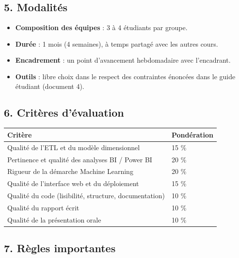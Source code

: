 \documentclass[11pt,a4paper]{article}
\providecommand{\tightlist}{\setlength{\itemsep}{0pt}\setlength{\parskip}{0pt}}
\begin{document}
\subsection{5. Modalités}\label{modalituxe9s}

\begin{itemize}
\tightlist
\item
  \textbf{Composition des équipes} : 3 à 4 étudiants par groupe.
\item
  \textbf{Durée} : 1 mois (4 semaines), à temps partagé avec les autres
  cours.
\item
  \textbf{Encadrement} : un point d'avancement hebdomadaire avec
  l'encadrant.
\item
  \textbf{Outils} : libre choix dans le respect des contraintes énoncées
  dans le guide étudiant (document 4).
\end{itemize}

\subsection{6. Critères d'évaluation}\label{crituxe8res-duxe9valuation}

{\def\LTcaptype{none} %
\begin{longtable}[]{@{}ll@{}}
\toprule\noalign{}
Critère & Pondération \\
\midrule\noalign{}
\endhead
\bottomrule\noalign{}
\endlastfoot
Qualité de l'ETL et du modèle dimensionnel & 15 \% \\
Pertinence et qualité des analyses BI / Power BI & 20 \% \\
Rigueur de la démarche Machine Learning & 20 \% \\
Qualité de l'interface web et du déploiement & 15 \% \\
Qualité du code (lisibilité, structure, documentation) & 10 \% \\
Qualité du rapport écrit & 10 \% \\
Qualité de la présentation orale & 10 \% \\
\end{longtable}
}

\subsection{7. Règles importantes}\label{ruxe8gles-importantes}
\end{document}
